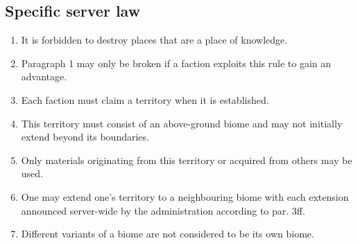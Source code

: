 \documentclass{article}
\begin{document}
\subsection{Specific server law}
\begin{enumerate}[(1)]
    \item It is forbidden to destroy places that are a place of knowledge.
	\item Paragraph 1 may only be broken if a faction exploits this rule to gain an advantage.
	\item Each faction must claim a territory when it is established.
	\item This territory must consist of an above-ground biome and may not initially extend beyond its boundaries.
	\item Only materials originating from this territory or acquired from others may be used.
	\item One may extend one's territory to a neighbouring biome with each extension announced server-wide by the administration according to par. 3ff.
	\item Different variants of a biome are not considered to be its own biome.
\end{enumerate}
\end{document}
